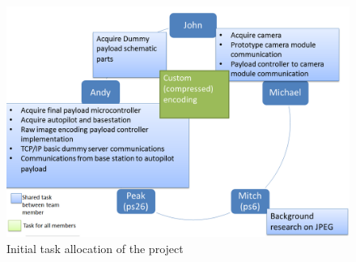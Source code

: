 \begin{figure}[H]
\begin{center}
\includegraphics[width=1.0\textwidth]{figures/initial_task_allocation.png} 
\end{center}
\caption{Initial task allocation of the project\label{task allocation}}
\end{figure}

